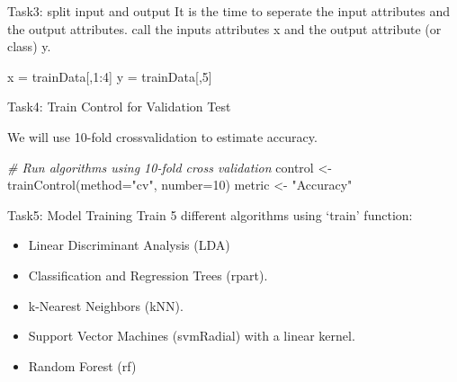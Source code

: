 \documentclass[
]{article}
\newenvironment{Shaded}{\begin{snugshade}}{\end{snugshade}}
\newcommand{\AttributeTok}[1]{\textcolor[rgb]{0.77,0.63,0.00}{#1}}
\newcommand{\CommentTok}[1]{\textcolor[rgb]{0.56,0.35,0.01}{\textit{#1}}}
\newcommand{\DecValTok}[1]{\textcolor[rgb]{0.00,0.00,0.81}{#1}}
\newcommand{\FunctionTok}[1]{\textcolor[rgb]{0.00,0.00,0.00}{#1}}
\newcommand{\NormalTok}[1]{#1}
\newcommand{\OtherTok}[1]{\textcolor[rgb]{0.56,0.35,0.01}{#1}}
\newcommand{\SpecialCharTok}[1]{\textcolor[rgb]{0.00,0.00,0.00}{#1}}
\newcommand{\StringTok}[1]{\textcolor[rgb]{0.31,0.60,0.02}{#1}}
\providecommand{\tightlist}{%
  \setlength{\itemsep}{0pt}\setlength{\parskip}{0pt}}
\begin{document}
Task3: split input and output It is the time to seperate the input
attributes and the output attributes. call the inputs attributes x and
the output attribute (or class) y.

\begin{Shaded}
\begin{Highlighting}[]
\NormalTok{x }\OtherTok{=}\NormalTok{ trainData[,}\DecValTok{1}\SpecialCharTok{:}\DecValTok{4}\NormalTok{]}
\NormalTok{y }\OtherTok{=}\NormalTok{ trainData[,}\DecValTok{5}\NormalTok{]}
\end{Highlighting}
\end{Shaded}

Task4: Train Control for Validation Test

We will use 10-fold crossvalidation to estimate accuracy.

\begin{Shaded}
\begin{Highlighting}[]
\CommentTok{\# Run algorithms using 10{-}fold cross validation}
\NormalTok{control }\OtherTok{\textless{}{-}} \FunctionTok{trainControl}\NormalTok{(}\AttributeTok{method=}\StringTok{"cv"}\NormalTok{, }\AttributeTok{number=}\DecValTok{10}\NormalTok{)}
\NormalTok{metric }\OtherTok{\textless{}{-}} \StringTok{"Accuracy"}
\end{Highlighting}
\end{Shaded}

Task5: Model Training Train 5 different algorithms using `train'
function:

\begin{itemize}
\tightlist
\item
  Linear Discriminant Analysis (LDA)
\item
  Classification and Regression Trees (rpart).
\item
  k-Nearest Neighbors (kNN).
\item
  Support Vector Machines (svmRadial) with a linear kernel.
\item
  Random Forest (rf)
\end{itemize}
\end{document}
